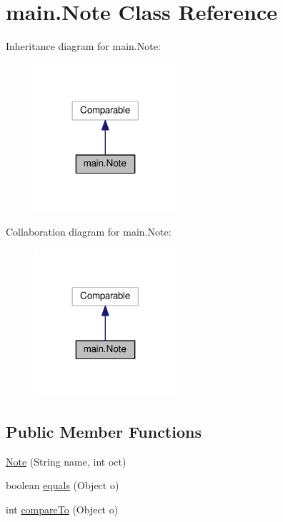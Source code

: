 \hypertarget{classmain_1_1_note}{}\section{main.\+Note Class Reference}
\label{classmain_1_1_note}


Inheritance diagram for main.\+Note\+:
\nopagebreak
\begin{figure}[H]
\begin{center}
\leavevmode
\includegraphics[width=149pt]{classmain_1_1_note__inherit__graph}
\end{center}
\end{figure}


Collaboration diagram for main.\+Note\+:
\nopagebreak
\begin{figure}[H]
\begin{center}
\leavevmode
\includegraphics[width=149pt]{classmain_1_1_note__coll__graph}
\end{center}
\end{figure}
\subsection*{Public Member Functions}
\begin{DoxyCompactItemize}
\item 
\hyperlink{classmain_1_1_note_a1d1d3400876a3557c35ce2cd837cb987}{Note} (String name, int oct)
\item 
boolean \hyperlink{classmain_1_1_note_a69dc307885a29732803e37e20418e13c}{equals} (Object o)
\item 
int \hyperlink{classmain_1_1_note_a7dd98a87720c3eade520c8c57a724643}{compare\+To} (Object o)
\end{DoxyCompactItemize}


